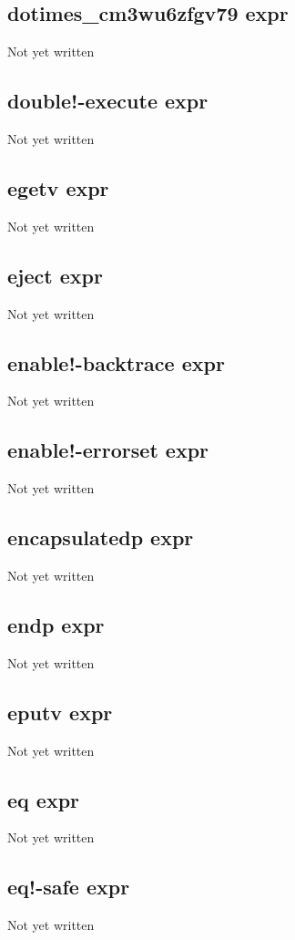 \documentclass[a4paper,11pt]{article}
\begin{document}
\subsection{\ttfamily dotimes\_cm3wu6zfgv79 expr}
Not yet written

\subsection{\ttfamily double!-execute expr}
Not yet written

\subsection{\ttfamily egetv expr}
Not yet written

\subsection{\ttfamily eject expr}
Not yet written

\subsection{\ttfamily enable!-backtrace expr}
Not yet written

\subsection{\ttfamily enable!-errorset expr}
Not yet written

\subsection{\ttfamily encapsulatedp expr}
Not yet written

\subsection{\ttfamily endp expr}
Not yet written

\subsection{\ttfamily eputv expr}
Not yet written

\subsection{\ttfamily eq expr}
Not yet written

\subsection{\ttfamily eq!-safe expr}
Not yet written
\end{document}
